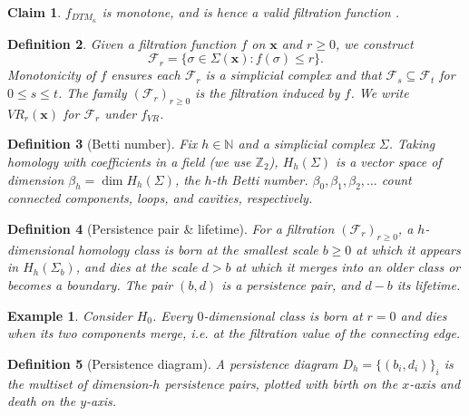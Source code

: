 \documentclass[11pt,a4paper]{article}
\newcommand{\N}{\mathbb{N}}
\newcommand{\Z}{\mathbb{Z}}
\newcommand{\pc}{\mathbf{x}}
\newcommand{\simpcom}{\Sigma}
\newcommand{\filt}{\mathcal{F}}
\theoremstyle{definitioncolon}
\newtheorem{definition}{Definition}[section]
\newtheorem{claim}[definition]{Claim}
\newtheorem*{example}{Example}
\begin{document}
    \begin{claim}
    \label{claim:dtm-monotone}
        $f_{DTM_\kappa}$ is monotone, and is hence a valid filtration function
        \citep[Prop.\ 3.5]{anai2020dtm}.
    \end{claim}

    \begin{definition}
    \label{def:filtration}
        Given a filtration function $f$ on $\pc$ and $r \geq 0$, we construct
            \[
            \mathcal{F}_r = \{\sigma \in \Sigma(\pc) : f(\sigma)
            \leq r\}.
            \]
        Monotonicity of $f$ ensures each $\mathcal{F}_r$ is a simplicial complex
        and that $\mathcal{F}_s \subseteq \mathcal{F}_t$ for $0 \leq s \leq t$.
        The family $(\mathcal{F}_r)_{r \geq 0}$ is the \emph{filtration} induced
        by $f$. We write $VR_r(\pc)$ for $\mathcal{F}_r$ under $f_{VR}$.
    \end{definition}

    \begin{definition}[Betti number]
    \label{def:betti}
        Fix $h \in \N$ and a simplicial complex $\Sigma$. Taking homology
        with coefficients in a field (we use $\Z_2$), $H_h(\simpcom)$ is a
        vector space of dimension $\beta_h = \dim H_h(\simpcom)$, the $h$-th
        \emph{Betti number}. $\beta_0, \beta_1, \beta_2, \dots$ count connected
        components, loops, and cavities, respectively.
    \end{definition}

    \begin{definition}[Persistence pair \& lifetime]
    \label{def:pers-pair}
        For a filtration $(\filt_r)_{r \geq 0}$, a $h$-dimensional homology
        class is \emph{born} at the smallest scale $b \geq 0$ at which it
        appears in $H_h(\simpcom_b)$, and \emph{dies} at the scale $d > b$ at
        which it merges into an older class or becomes a boundary. The pair
        $(b,d)$ is a \emph{persistence pair}, and $d - b$ its \emph{lifetime}.
    \end{definition}

    \begin{example}
        Consider $H_0$. Every $0$-dimensional class is born at $r=0$ and dies
        when its two components merge, i.e. at the filtration value of the
        connecting edge.
    \end{example}

    \begin{definition}[Persistence diagram]
    \label{def:pd}
        A persistence diagram $D_h = \{(b_i, d_i)\}_i$ is the multiset of
        dimension-$h$ persistence pairs, plotted with birth on the $x$-axis and
        death on the $y$-axis.
    \end{definition}
\end{document}
